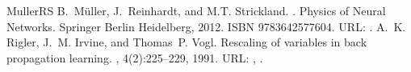\documentclass[a4paper,12pt,polish]{jupyterBook}
\begin{document}
\begin{sphinxthebibliography}{MullerRS}
\sphinxAtStartPar
B. Müller, J. Reinhardt, and M.T. Strickland. . Physics of Neural Networks. Springer Berlin Heidelberg, 2012. ISBN 9783642577604. URL: .
\sphinxAtStartPar
A. K. Rigler, J. M. Irvine, and Thomas P. Vogl. Rescaling of variables in back propagation learning. , 4(2):225–229, 1991. URL: , .
\end{sphinxthebibliography}







\renewcommand{\indexname}{Indeks}
\printindex
\end{document}
